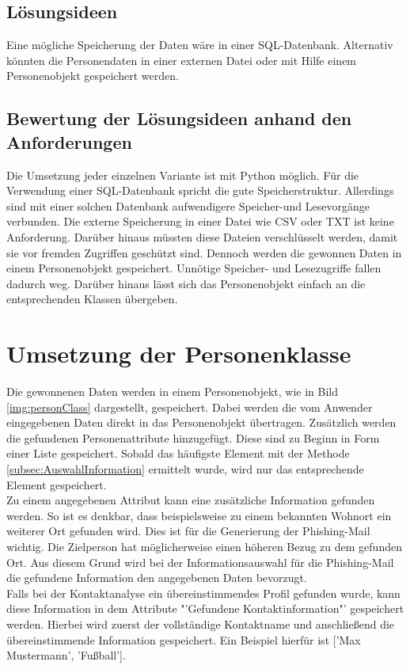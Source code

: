 	\subsection{Lösungsideen}
	Eine mögliche Speicherung der Daten wäre in einer SQL-Datenbank. Alternativ könnten die Personendaten in einer externen Datei oder mit Hilfe einem Personenobjekt gespeichert werden.
	\subsection{Bewertung der Lösungsideen anhand den Anforderungen}
	Die Umsetzung jeder einzelnen Variante ist mit Python möglich. Für die Verwendung einer SQL-Datenbank spricht die gute Speicherstruktur. Allerdings sind mit einer solchen Datenbank aufwendigere Speicher-und Lesevorgänge verbunden. Die externe Speicherung in einer Datei wie CSV oder TXT ist keine Anforderung. Darüber hinaus müssten diese Dateien verschlüsselt werden, damit sie vor fremden Zugriffen geschützt sind. Dennoch werden die gewonnen Daten in einem Personenobjekt gespeichert. Unnötige Speicher- und Lesezugriffe fallen dadurch weg. Darüber hinaus lässt sich das Personenobjekt einfach an die entsprechenden Klassen übergeben.
\section{Umsetzung der Personenklasse}
Die gewonnenen Daten werden in einem Personenobjekt, wie in Bild \ref{img:personClass} dargestellt, gespeichert. Dabei werden die vom Anwender eingegebenen Daten direkt in das Personenobjekt übertragen. Zusätzlich werden die gefundenen Personenattribute hinzugefügt. Diese sind zu Beginn in Form einer Liste gespeichert. Sobald das häufigste Element mit der Methode \ref{subsec:AuswahlInformation} ermittelt wurde, wird nur das entsprechende Element gespeichert.\\
Zu einem angegebenen Attribut kann eine zusätzliche Information gefunden werden. So ist es denkbar, dass beispielsweise zu einem bekannten Wohnort ein weiterer Ort gefunden wird. Dies ist für die Generierung der Phishing-Mail wichtig. Die Zielperson hat möglicherweise einen höheren Bezug zu dem gefunden Ort. Aus diesem Grund wird bei der Informationsauswahl für die Phishing-Mail die gefundene Information den angegebenen Daten bevorzugt.\\
Falls bei der Kontaktanalyse ein übereinstimmendes Profil gefunden wurde, kann diese Information in dem Attribute "'Gefundene Kontaktinformation"' gespeichert werden. Hierbei wird zuerst der vollständige Kontaktname und anschließend die übereinstimmende Information gespeichert. Ein Beispiel hierfür ist ['Max Mustermann', 'Fußball'].\\\\
	
